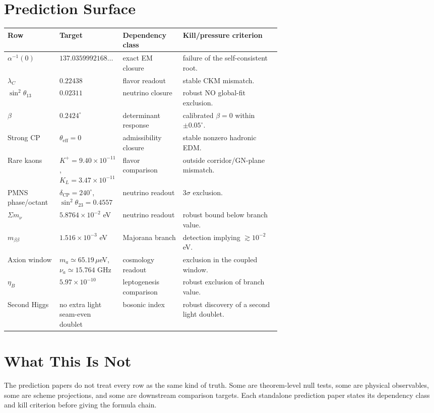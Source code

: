 \documentclass[10pt,a4paper]{article}
\begin{document}
\newpage

\section*{Prediction Surface}
\begin{center}
\scriptsize
\begin{tabularx}{\linewidth}{@{}p{0.19\linewidth}p{0.22\linewidth}p{0.22\linewidth}Y@{}}
\toprule
Row & Target & Dependency class & Kill/pressure criterion \\
\midrule
$\alpha^{-1}(0)$ & $137.0359992168\ldots$ & exact EM closure & failure of the self-consistent root.\\
$\lambda_C$ & $0.22438$ & flavor readout & stable CKM mismatch.\\
$\sin^2\theta_{13}$ & $0.02311$ & neutrino closure & robust NO global-fit exclusion.\\
$\beta$ & $0.2424^\circ$ & determinant response & calibrated $\beta=0$ within $\pm0.05^\circ$.\\
Strong CP & $\theta_{\mathrm{eff}}=0$ & admissibility closure & stable nonzero hadronic EDM.\\
Rare kaons & $K^+=9.40{\times}10^{-11}$, $K_L=3.47{\times}10^{-11}$ & flavor comparison & outside corridor/GN-plane mismatch.\\
PMNS phase/octant & $\delta_{\mathrm{CP}}=240^\circ$, $\sin^2\theta_{23}=0.4557$ & neutrino readout & $3\sigma$ exclusion.\\
$\Sigma m_\nu$ & $5.8764{\times}10^{-2}$ eV & neutrino readout & robust bound below branch value.\\
$m_{\beta\beta}$ & $1.516{\times}10^{-3}$ eV & Majorana branch & detection implying $\gtrsim10^{-2}$ eV.\\
Axion window & $m_a\simeq65.19\,\mu$eV, $\nu_a\simeq15.764$ GHz & cosmology readout & exclusion in the coupled window.\\
$\eta_B$ & $5.97{\times}10^{-10}$ & leptogenesis comparison & robust exclusion of branch value.\\
Second Higgs & no extra light seam-even doublet & bosonic index & robust discovery of a second light doublet.\\
\bottomrule
\end{tabularx}
\end{center}

\section*{What This Is Not}
The prediction papers do not treat every row as the same kind of truth. Some are theorem-level
null tests, some are physical observables, some are scheme projections, and some are downstream
comparison targets. Each standalone prediction paper states its dependency class and kill criterion
before giving the formula chain.
\end{document}
